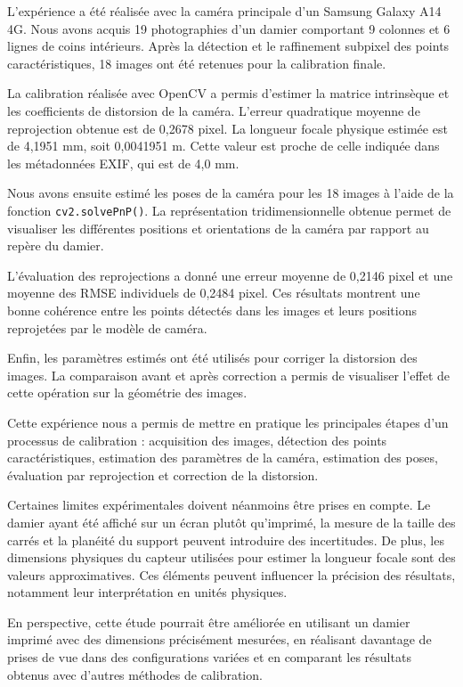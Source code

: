 \documentclass[12pt,a4paper]{report}
\begin{document}
L'expérience a été réalisée avec la caméra principale d'un
Samsung Galaxy A14 4G. Nous avons acquis 19 photographies
d'un damier comportant 9 colonnes et 6 lignes de coins
intérieurs. Après la détection et le raffinement subpixel des
points caractéristiques, 18 images ont été retenues pour
la calibration finale.

La calibration réalisée avec OpenCV a permis d'estimer la
matrice intrinsèque et les coefficients de distorsion de la
caméra. L'erreur quadratique moyenne de reprojection obtenue
est de 0,2678 pixel. La longueur focale physique estimée
est de 4,1951 mm, soit 0,0041951 m. Cette valeur est proche
de celle indiquée dans les métadonnées EXIF, qui est de
4,0 mm.

Nous avons ensuite estimé les poses de la caméra pour les
18 images à l'aide de la fonction \texttt{cv2.solvePnP()}.
La représentation tridimensionnelle obtenue permet de
visualiser les différentes positions et orientations de la
caméra par rapport au repère du damier.

L'évaluation des reprojections a donné une erreur moyenne
de 0,2146 pixel et une moyenne des RMSE individuels de
0,2484 pixel. Ces résultats montrent une bonne cohérence
entre les points détectés dans les images et leurs positions
reprojetées par le modèle de caméra.

Enfin, les paramètres estimés ont été utilisés pour corriger
la distorsion des images. La comparaison avant et après
correction a permis de visualiser l'effet de cette opération
sur la géométrie des images.

Cette expérience nous a permis de mettre en pratique les
principales étapes d'un processus de calibration : acquisition
des images, détection des points caractéristiques, estimation
des paramètres de la caméra, estimation des poses, évaluation
par reprojection et correction de la distorsion.

Certaines limites expérimentales doivent néanmoins être
prises en compte. Le damier ayant été affiché sur un écran
plutôt qu'imprimé, la mesure de la taille des carrés et la
planéité du support peuvent introduire des incertitudes.
De plus, les dimensions physiques du capteur utilisées pour
estimer la longueur focale sont des valeurs approximatives.
Ces éléments peuvent influencer la précision des résultats,
notamment leur interprétation en unités physiques.

En perspective, cette étude pourrait être améliorée en
utilisant un damier imprimé avec des dimensions précisément
mesurées, en réalisant davantage de prises de vue dans des
configurations variées et en comparant les résultats obtenus
avec d'autres méthodes de calibration.
\end{document}
